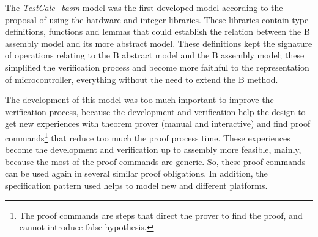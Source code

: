 \documentclass[11pt]{article} %
\begin{document}
The \textit{TestCalc\_basm} model was the first developed model according to
the proposal of \cite{Dantas_SBMF08} using the hardware and integer libraries. These
libraries contain type definitions, functions and lemmas that
could establish the relation between the B assembly model and its more
abstract model. These definitions kept the signature of operations relating to 
the B abstract model and the B assembly model; these simplified the
verification process and become more faithful to the representation of
microcontroller, everything without the need to extend the B method.


The development of this model was too much important to improve the verification
process, because the development and verification help the design to get new
experiences with theorem prover (manual and interactive) and find proof
commands\footnote{The proof commands are steps that direct the prover to find the
proof, and cannot introduce false hypothesis.} that reduce too much the proof
process time. These experiences become the development and verification up to
assembly more feasible, mainly, because the most of the proof commands are
generic. So, these proof commands can be used again in several similar proof
obligations. In addition, the specification pattern used helps to model new and
different platforms.

\end{document}
